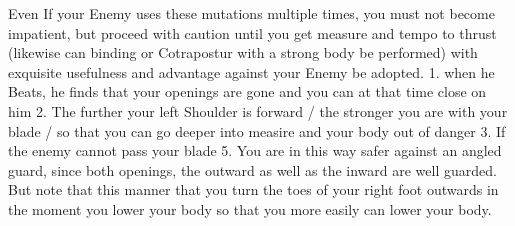 
Even If your Enemy uses these mutations multiple times, you must not
become impatient, but proceed with caution until you get measure and
tempo to thrust (likewise can binding or Cotrapostur with a strong
body be performed) with exquisite usefulness and advantage against
your Enemy be adopted. 1. when he Beats, he finds that your openings
are gone and you can at that time close on him 2. The further your
left Shoulder is forward / the stronger you are with your blade / so
that you can go deeper into measire and your body out of danger 3. If
the enemy cannot pass your blade 5. You are in this way safer against
an angled guard, since both openings, the outward as well as the
inward are well guarded. But note that this manner that you turn the
toes of your right foot outwards in the moment you lower your body so
that you more easily can lower your body.


